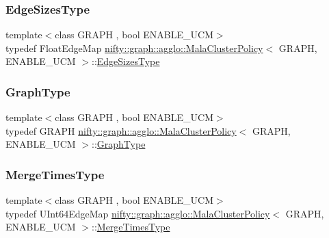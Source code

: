 \subsubsection{\texorpdfstring{Edge\+Sizes\+Type}{EdgeSizesType}}
{\footnotesize\ttfamily template$<$class G\+R\+A\+PH , bool E\+N\+A\+B\+L\+E\+\_\+\+U\+CM$>$ \\
typedef Float\+Edge\+Map \hyperlink{classnifty_1_1graph_1_1agglo_1_1MalaClusterPolicy}{nifty\+::graph\+::agglo\+::\+Mala\+Cluster\+Policy}$<$ G\+R\+A\+PH, E\+N\+A\+B\+L\+E\+\_\+\+U\+CM $>$\+::\hyperlink{classnifty_1_1graph_1_1agglo_1_1MalaClusterPolicy_a33924545e782bd520270341b21599e7e}{Edge\+Sizes\+Type}}

\mbox{\label{classnifty_1_1graph_1_1agglo_1_1MalaClusterPolicy_ae2696b85f3f04787282e003bead20a5d}} 
\subsubsection{\texorpdfstring{Graph\+Type}{GraphType}}
{\footnotesize\ttfamily template$<$class G\+R\+A\+PH , bool E\+N\+A\+B\+L\+E\+\_\+\+U\+CM$>$ \\
typedef G\+R\+A\+PH \hyperlink{classnifty_1_1graph_1_1agglo_1_1MalaClusterPolicy}{nifty\+::graph\+::agglo\+::\+Mala\+Cluster\+Policy}$<$ G\+R\+A\+PH, E\+N\+A\+B\+L\+E\+\_\+\+U\+CM $>$\+::\hyperlink{classnifty_1_1graph_1_1agglo_1_1MalaClusterPolicy_ae2696b85f3f04787282e003bead20a5d}{Graph\+Type}}

\mbox{\label{classnifty_1_1graph_1_1agglo_1_1MalaClusterPolicy_aa786f31f24cedb64409047e19eb2e7c4}} 
\subsubsection{\texorpdfstring{Merge\+Times\+Type}{MergeTimesType}}
{\footnotesize\ttfamily template$<$class G\+R\+A\+PH , bool E\+N\+A\+B\+L\+E\+\_\+\+U\+CM$>$ \\
typedef U\+Int64\+Edge\+Map \hyperlink{classnifty_1_1graph_1_1agglo_1_1MalaClusterPolicy}{nifty\+::graph\+::agglo\+::\+Mala\+Cluster\+Policy}$<$ G\+R\+A\+PH, E\+N\+A\+B\+L\+E\+\_\+\+U\+CM $>$\+::\hyperlink{classnifty_1_1graph_1_1agglo_1_1MalaClusterPolicy_aa786f31f24cedb64409047e19eb2e7c4}{Merge\+Times\+Type}}

